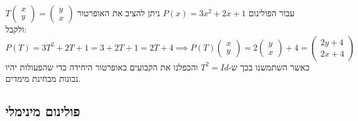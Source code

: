 \documentclass{tstextbook}
\begin{document}
\begin{example}
עבור הפולינום \(P(x)=3x^{2}+2x+1\) ניתן להציב את האופרטור \(T\begin{pmatrix}x\\y\end{pmatrix}=\begin{pmatrix}y\\x\end{pmatrix}\) ולקבל:
$$P(T)=3T^2+2T+1=3+2T+1=2T+4\implies P(T)\begin{pmatrix}x \\ y\end{pmatrix}=2\begin{pmatrix}y \\ x\end{pmatrix}+4=\begin{pmatrix}2y + 4 \\ 2x + 4
\end{pmatrix}$$
כאשר השתמשנו בכך ש-\(T^{2}=Id\) והכפלנו את הקבועים באופרטור היחידה כדי שהפעולות יהיו נכונות מבחינת מימדים.

\end{example}
\subsection{פולינום מינימלי}
\end{document}
